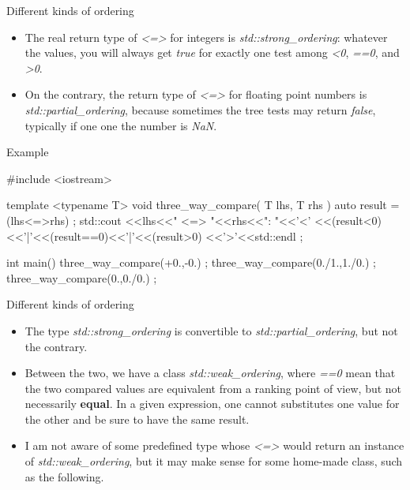 \begin{frame}[fragile]
  \begin{block}{Different kinds of ordering}
    \begin{itemize}
    \item The real return type of {\it <=>} for integers is {\it std::strong_ordering}: whatever the values, you will always get {\it true} for exactly one test among {\it <0}, {\it ==0}, and {\it >0}.
    \item On the contrary, the return type of {\it <=>} for floating point numbers is {\it std::partial_ordering}, because sometimes the tree tests may return {\it false}, typically if one one the number is {\it NaN}.
    \end{itemize}
  \end{block}
  \begin{exampleblock}{Example}
    \begin{cppcode*}{}
#include <iostream>

template <typename T>
void three_way_compare( T lhs, T rhs )
 {
  auto result = (lhs<=>rhs) ;
  std::cout
    <<lhs<<" <=> "<<rhs<<": "<<'<'
    <<(result<0)<<'|'<<(result==0)<<'|'<<(result>0)
    <<'>'<<std::endl ;
 }

int main()
 {
  three_way_compare(+0.,-0.) ;
  three_way_compare(0./1.,1./0.) ;
  three_way_compare(0.,0./0.) ;
 }
    \end{cppcode*}
  \end{exampleblock}
\end{frame}

\begin{frame}[fragile]
  \begin{block}{Different kinds of ordering}
    \begin{itemize}
      \item The type {\it std::strong_ordering} is convertible to {\it std::partial_ordering}, but not the contrary.
      \item Between the two, we have a class {\it std::weak_ordering}, where {\it ==0} mean that the two compared values are equivalent from a ranking point of view, but not necessarily \textbf{equal}. In a given expression, one cannot substitutes one value for the other and be sure to have the same result.
      \item I am not aware of some predefined type whose {\it <=>} would return an instance of {\it std::weak_ordering}, but it may make sense for some home-made class, such as the following.
    \end{itemize}
  \end{block}
\end{frame}

